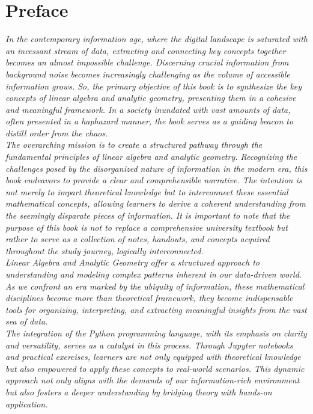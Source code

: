 \chapter*{Preface}

\textit{In the contemporary information age, where the digital landscape is saturated with an incessant stream of data, extracting and connecting key concepts together becomes an almost impossible challenge. Discerning crucial information from background noise becomes increasingly challenging as the volume of accessible information grows. So, the primary objective of this book is to synthesize the key concepts of linear algebra and analytic geometry, presenting them in a cohesive and meaningful framework. In a society inundated with vast amounts of data, often presented in a haphazard manner, the book serves as a guiding beacon to distill order from the chaos.}
\\

\textit{The overarching mission is to create a structured pathway through the fundamental principles of linear algebra and analytic geometry. Recognizing the challenges posed by the disorganized nature of information in the modern era, this book endeavors to provide a clear and comprehensible narrative. The intention is not merely to impart theoretical knowledge but to interconnect these essential mathematical concepts, allowing learners to derive a coherent understanding from the seemingly disparate pieces of information. It is important to note that the purpose of this book is not to replace a comprehensive university textbook but rather to serve as a collection of notes, handouts, and concepts acquired throughout the study journey, logically interconnected.}
\\

\textit{Linear Algebra and Analytic Geometry offer a structured approach to understanding and modeling complex patterns inherent in our data-driven world. As we confront an era marked by the ubiquity of information, these mathematical disciplines become more than theoretical framework, they become indispensable tools for organizing, interpreting, and extracting meaningful insights from the vast sea of data.}
\\

\textit{The integration of the Python programming language, with its emphasis on clarity and versatility, serves as a catalyst in this process. Through Jupyter notebooks and practical exercises, learners are not only equipped with theoretical knowledge but also empowered to apply these concepts to real-world scenarios. This dynamic approach not only aligns with the demands of our information-rich environment but also fosters a deeper understanding by bridging theory with hands-on application.}
\\

